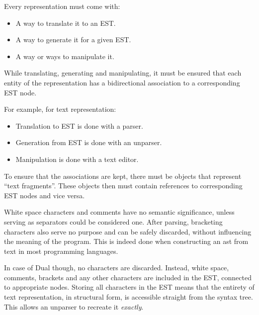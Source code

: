Every representation must come with:
\begin{itemize}
    \item A way to translate it to an EST.
    \item A way to generate it for a given EST.
    \item A way or ways to manipulate it.
\end{itemize}

While translating, generating and manipulating, it must be ensured that each entity of the representation has a bidirectional association to a corresponding EST node.

For example, for text representation:
\begin{itemize}
    \item Translation to EST is done with a parser.
    \item Generation from EST is done with an unparser\cite{unparser_wikipedia}.
    \item Manipulation is done with a text editor.
\end{itemize}

To ensure that the associations are kept, there must be objects that represent ``text fragments''. These objects then must contain references to corresponding EST nodes and vice versa.

White space characters and comments have no semantic significance, unless serving as separators could be considered one. After parsing, bracketing characters also serve no purpose and can be safely discarded, without influencing the meaning of the program. This is indeed done when constructing an \acrshort{ast} from text in most programming languages.

In case of Dual though, no characters are discarded. Instead, white space, comments, brackets and any other characters are included in the EST, connected to appropriate nodes. Storing all characters in the EST means that the entirety of text representation, in structural form, is accessible straight from the syntax tree. This allows an unparser to recreate it \textit{exactly}.

